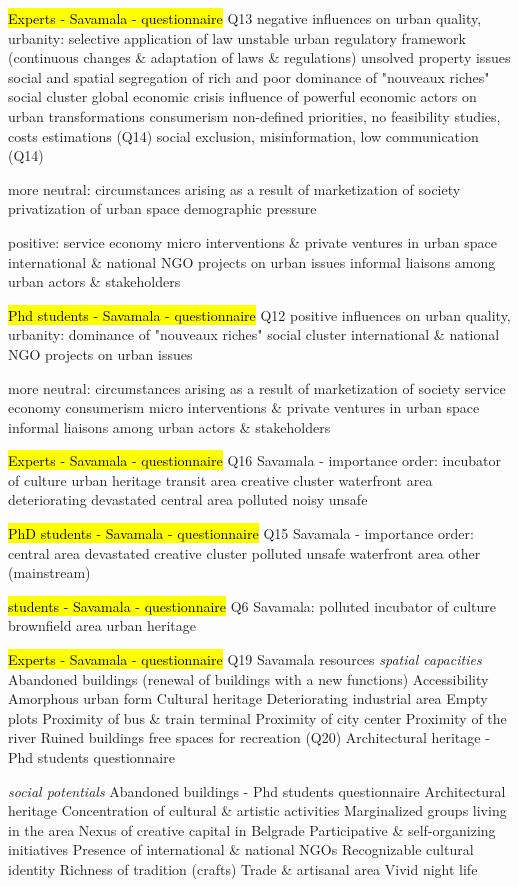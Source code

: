 \documentclass[11pt]{report}
\begin{document}
\hl{Experts - Savamala - questionnaire}
Q13
negative influences on  urban quality, urbanity:
selective application of law
unstable urban regulatory framework (continuous changes \& adaptation of laws \& regulations)
unsolved property issues
social and spatial segregation of rich and poor
dominance of "nouveaux riches" social cluster
global economic crisis
influence of powerful economic actors on urban transformations
consumerism
non-defined priorities, no feasibility studies, costs estimations (Q14)
social exclusion, misinformation, low communication (Q14)

more neutral:
circumstances arising as a result of marketization of society
privatization of urban space
demographic pressure

positive:
service economy
micro interventions \& private ventures in urban space
international \& national NGO projects on urban issues
informal liaisons among urban actors \& stakeholders

\hl{Phd students - Savamala - questionnaire}
Q12 positive influences on  urban quality, urbanity:
dominance of "nouveaux riches" social cluster
international \& national NGO projects on urban issues

more neutral:
circumstances arising as a result of marketization of society
service economy
consumerism
micro interventions \& private ventures in urban space
informal liaisons among urban actors \& stakeholders

\hl{Experts - Savamala - questionnaire}
Q16 Savamala - importance order:
incubator of culture
urban heritage
transit area
creative cluster
waterfront area
deteriorating
devastated
central area
polluted
noisy
unsafe

\hl{PhD students - Savamala - questionnaire}
Q15 Savamala - importance order:
central area
devastated
creative cluster
polluted
unsafe
waterfront area
other (mainstream)

\hl{students - Savamala - questionnaire}
Q6 Savamala:
polluted
incubator of
culture
brownfield area
urban heritage

\hl{Experts - Savamala - questionnaire}
Q19 Savamala resources
\textit{spatial capacities}
Abandoned buildings (renewal of buildings with a new functions)
Accessibility
Amorphous urban form
Cultural heritage
Deteriorating industrial area
Empty plots
Proximity of bus \& train terminal
Proximity of city center
Proximity of the river
Ruined buildings
free spaces for recreation (Q20)
Architectural heritage - Phd students questionnaire

\textit{social potentials}
Abandoned buildings - Phd students questionnaire
Architectural heritage
Concentration of cultural \& artistic activities
Marginalized groups living in the area
Nexus of creative capital in Belgrade
Participative \& self-organizing initiatives
Presence of international \& national NGOs
Recognizable cultural identity
Richness of tradition (crafts)
Trade \& artisanal area
Vivid night life
\end{document}
